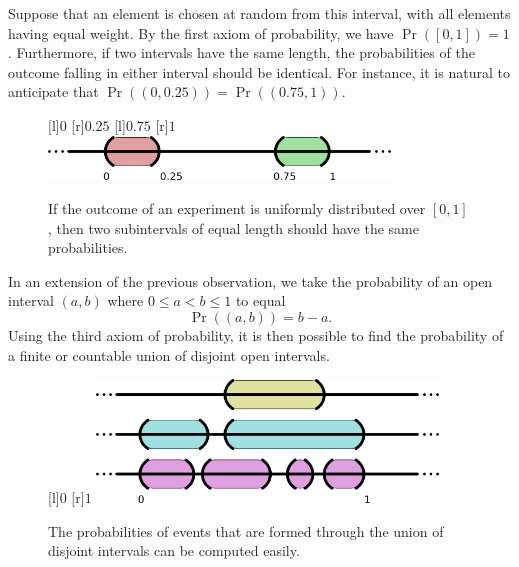 Suppose that an element is chosen at random from this interval, with all elements having equal weight.
By the first axiom of probability, we have $\Pr \left( [0,1] \right) = 1$.
Furthermore, if two intervals have the same length, the probabilities of the outcome falling in either interval should be identical.
For instance, it is natural to anticipate that $\Pr \left( \left( 0, 0.25 \right) \right) = \Pr \left( \left( 0.75, 1 \right) \right)$.

\begin{figure}[htb!]
\begin{center}
\begin{psfrags}
[l]{$0$}
[r]{$0.25$}
[l]{$0.75$}
[r]{$1$}
\includegraphics[height=1.185cm]{Figures/2Chapter/intervals}
\end{psfrags}
\caption{If the outcome of an experiment is uniformly distributed over $[0,1]$, then two subintervals of equal length should have the same probabilities.}
\end{center}
\end{figure}

In an extension of the previous observation, we take the probability of an open interval $(a, b)$ where $0 \leq a < b \leq 1$ to equal
\begin{equation} \label{equation:DefinitionProbabilityLaw1}
\Pr ( (a,b) ) = b - a .
\end{equation}
Using the third axiom of probability, it is then possible to find the probability of a finite or countable union of disjoint open intervals.

\begin{figure}[htb!]
\begin{center}
\begin{psfrags}
[l]{$0$}
[r]{$1$}
\includegraphics[height=3.28cm]{Figures/2Chapter/lineintervals}
\end{psfrags}
\caption{The probabilities of events that are formed through the union of disjoint intervals can be computed easily.}
\end{center}
\end{figure}

